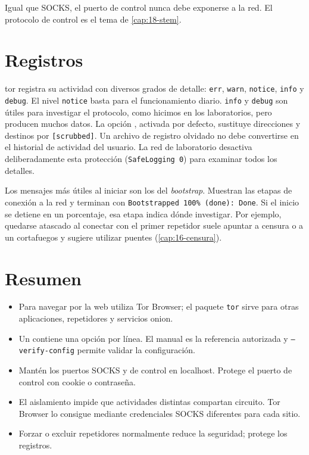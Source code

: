 Igual que SOCKS, el puerto de control nunca debe exponerse a la red. El protocolo de control es el tema de \cref{cap:18-stem}.

\section{Registros}\label{sec:torrc-log}

tor registra su actividad con diversos grados de detalle: \texttt{err}, \texttt{warn}, \texttt{notice}, \texttt{info} y \texttt{debug}. El nivel \texttt{notice} basta para el funcionamiento diario. \texttt{info} y \texttt{debug} son útiles para investigar el protocolo, como hicimos en los laboratorios, pero producen muchos datos. La opción , activada por defecto, sustituye direcciones y destinos por \texttt{[scrubbed]}. Un archivo de registro olvidado no debe convertirse en el historial de actividad del usuario. La red de laboratorio desactiva deliberadamente esta protección (\texttt{SafeLogging 0}) para examinar todos los detalles.

Los mensajes más útiles al iniciar son los del \emph{bootstrap}. Muestran las etapas de conexión a la red y terminan con \texttt{Bootstrapped 100\% (done): Done}. Si el inicio se detiene en un porcentaje, esa etapa indica dónde investigar. Por ejemplo, quedarse atascado al conectar con el primer repetidor suele apuntar a censura o a un cortafuegos y sugiere utilizar puentes (\cref{cap:16-censura}).

\section*{Resumen}
\begin{itemize}
  \item Para navegar por la web utiliza Tor Browser; el paquete \texttt{tor} sirve para otras aplicaciones, repetidores y servicios onion.
  \item Un  contiene una opción por línea. El manual es la referencia autorizada y \texttt{--verify-config} permite validar la configuración.
  \item Mantén los puertos SOCKS y de control en localhost. Protege el puerto de control con cookie o contraseña.
  \item El aislamiento impide que actividades distintas compartan circuito. Tor Browser lo consigue mediante credenciales SOCKS diferentes para cada sitio.
  \item Forzar o excluir repetidores normalmente reduce la seguridad;  protege los registros.
\end{itemize}

